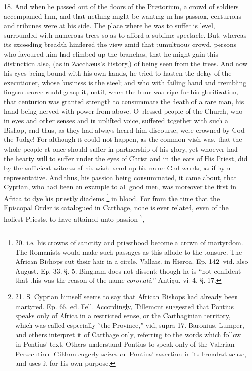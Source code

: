 18. And when he passed out of
the doors of the Prætorium, a crowd of soldiers accompanied him, and
that nothing might be wanting in his passion, centurions and tribunes
were at his side. The place where he was to suffer is level,
surrounded with numerous trees so as to afford a sublime spectacle.
But, whereas its exceeding breadth hindered the view amid that
tumultuous crowd, persons who favoured him had climbed up the
branches, that he might gain this distinction also, (as in Zacchæus's
history,) of being seen from the trees. And now his eyes being bound
with his own hands, he tried to hasten the delay of the executioner,
whose business is the steel; and who with failing hand and trembling
fingers scarce could grasp it, until, when the hour was ripe for his
glorification, that centurion was granted strength to consummate the
death of a rare man, his hand being nerved with power from above. O
blessed people of the Church, who in eyes and other senses and in
uplifted voice, suffered together with such a Bishop, and thus, as
they had always heard him discourse, were crowned by God the Judge!
For although it could not happen, as the common wish was, that the
whole people at once should suffer in partnership of his glory, yet
whoever had the hearty will to suffer under the eyes of Christ and in
the ears of His Priest, did by the sufficient witness of his wish,
send up his name God-wards, as if by a representative. And thus, his
passion being consummated, it came about, that Cyprian, who had been
an example to all good men, was moreover the first in Africa to dye
his priestly diadems \footnote{20. i.e.
his crowns of sanctity and priesthood become a crown of martyrdom. The
Romanists would make such passages as this allude to the tonsure. The
African Bishops cut their hair in a circle. Vallars. in Hieron. Ep.
142. vid. also August. Ep. 33. §. 5. Bingham does not dissent; though
he is ``not confident that this was the reason of the name \emph{coronati.}''
Antiqu. vi. 4. §. 17.} in blood. For from the time that the Episcopal Order is catalogued in
Carthage, none is ever related, even of the holiest Priests, to have
attained unto passion \footnote{21. S.
Cyprian himself seems to say that African Bishops had already been
martyred. Ep. 66. ed. Fell. Accordingly, Tillemont suggested that
Pontius speaks only of Africa in a restricted sense, or the
Carthaginian territory, which was called especially ``the Province,''
vid, supra 17. Baronius, Lumper, and others interpret it of Carthage
only, referring to the words which follow in Pontius' text. Others
understand Pontius to speak only of the Valerian Persecution. Gibbon
eagerly seizes on Pontius' assertion in its broadest sense, and uses
it for his own purpose.},
